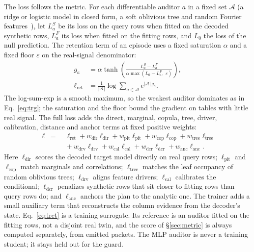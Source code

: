 \documentclass[10pt,letterpaper,twocolumn]{article}
\begin{document}
The loss follows the metric. For each differentiable auditor $a$ in a fixed set $\mathcal{A}$ (a ridge or logistic model in closed form, a soft oblivious tree and random Fourier features~\cite{rahimi2007rff}), let $L^{S}_{a}$ be its loss on the query rows when fitted on the decoded synthetic rows, $L^{F}_{a}$ its loss when fitted on the fitting rows, and $L_0$ the loss of the null prediction. The retention term of an episode uses a fixed saturation $\alpha$ and a fixed floor $\varepsilon$ on the real-signal denominator:
\begin{equation}\label{eq:lret}
\begin{aligned}
g_a &= \alpha\tanh\!\left(\frac{L^{S}_{a}-L^{F}_{a}}{\alpha\max(L_0-L^{F}_{a},\;\varepsilon)}\right),\\
\ell_{\mathrm{ret}} &= \tfrac{1}{|\mathcal{A}|}\log\sum\nolimits_{a\in\mathcal{A}} e^{|\mathcal{A}|\,g_a}.
\end{aligned}
\end{equation}
The log-sum-exp is a smooth maximum, so the weakest auditor dominates as in Eq.~\eqref{eq:trg}; the saturation and the floor bound the gradient on tables with little real signal. The full loss adds the direct, marginal, copula, tree, driver, calibration, distance and anchor terms at fixed positive weights:
\begin{equation}\label{eq:loss}
\begin{aligned}
\ell \;=\;& \ell_{\mathrm{ret}} + w_{\mathrm{dir}}\ell_{\mathrm{dir}} + w_{\mathrm{pit}}\ell_{\mathrm{pit}} + w_{\mathrm{cop}}\ell_{\mathrm{cop}} + w_{\mathrm{tree}}\ell_{\mathrm{tree}}\\
 & {}+ w_{\mathrm{drv}}\ell_{\mathrm{drv}} + w_{\mathrm{cal}}\ell_{\mathrm{cal}} + w_{\mathrm{dcr}}\ell_{\mathrm{dcr}} + w_{\mathrm{anc}}\ell_{\mathrm{anc}}.
\end{aligned}
\end{equation}
Here $\ell_{\mathrm{dir}}$ scores the decoded target model directly on real query rows; $\ell_{\mathrm{pit}}$ and $\ell_{\mathrm{cop}}$ match marginals and correlations; $\ell_{\mathrm{tree}}$ matches the leaf occupancy of random oblivious trees; $\ell_{\mathrm{drv}}$ aligns feature drivers; $\ell_{\mathrm{cal}}$ calibrates the conditional; $\ell_{\mathrm{dcr}}$ penalizes synthetic rows that sit closer to fitting rows than query rows do; and $\ell_{\mathrm{anc}}$ anchors the plan to the analytic one. The trainer adds a small auxiliary term that reconstructs the column evidence from the decoder's state. Eq.~\eqref{eq:lret} is a training surrogate. Its reference is an auditor fitted on the fitting rows, not a disjoint real twin, and the score of \S\ref{sec:metric} is always computed separately, from emitted packets. The MLP auditor is never a training student; it stays held out for the guard.
\end{document}

